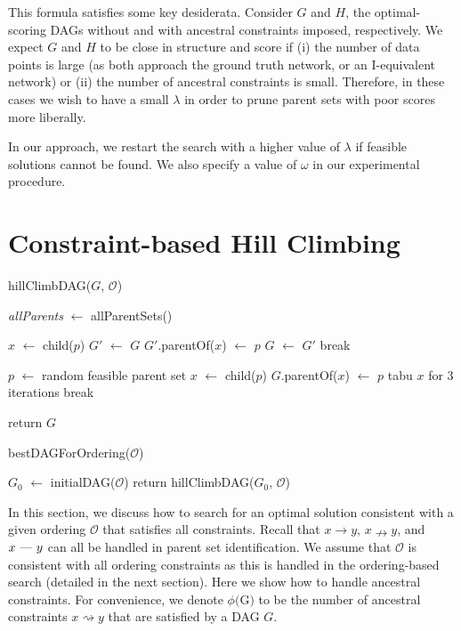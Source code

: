 \documentclass[twoside,11pt]{article}
\begin{document}
\smallskip
This formula satisfies some key desiderata. Consider $G$ and $H$, the optimal-scoring DAGs without and with ancestral constraints imposed, respectively. 
We expect $G$ and $H$ to be close in structure and score if (i) the number of data points is large (as both approach the ground truth network, or an I-equivalent network)
or (ii) the number of ancestral constraints is small. Therefore, in these cases we wish to have a small $\lambda$ in order to prune parent sets with poor scores more liberally.
  
\smallskip
In our approach, we restart the search with a higher value of $\lambda$ if feasible solutions cannot be found. We also specify a value of $\omega$ in our experimental procedure.


\section{Constraint-based Hill Climbing}
\label{SECTION:ConstraintBasedHillClimbing}

\begin{algorithm}[t]
	\caption{hillClimbDAG($G$, $\mathcal{O}$)}
 		\emph{allParents} $\leftarrow$ allParentSets()  
		
		 {
			 {
				$x$ $\leftarrow$ child($p$) \;
				 {
					$G'$ $\leftarrow$ $G$\;
					$G'$.parentOf($x$) $\leftarrow$ $p$ \;
					 {
						$G$ $\leftarrow$ $G'$ \;
						break \;
					}
				}
			}
			
			 {
				 { 
					$p$ $\leftarrow$ random feasible parent set\;
					$x$ $\leftarrow$ child($p$) \;
					$G$.parentOf($x$) $\leftarrow$ $p$ \;
					tabu $x$ for $3$ iterations \;
				}
				 {
					break \;
				}
			}
			
		}
	
	return $G$ \;
\end{algorithm}
\begin{algorithm}[t]
	\caption{bestDAGForOrdering($\mathcal{O}$)}
 		$G_0$ $\leftarrow$ initialDAG($\mathcal{O}$) \;
		return hillClimbDAG($G_0$, $\mathcal{O}$) \;
\end{algorithm}

In this section, we discuss how to search for an optimal solution consistent with a given ordering $\mathcal{O}$ that satisfies all constraints. Recall that  $x \rightarrow y$, $x \nrightarrow y$, and $x \text{ \textemdash \  } y$ can all be handled in parent set identification. We assume that $\mathcal{O}$ is consistent with all ordering constraints as this is handled in the ordering-based search (detailed in the next section). Here we show how to handle ancestral constraints.
For convenience, we denote $\phi($G$)$ to be the number of ancestral constraints $x \rightsquigarrow y$ that are satisfied by a DAG $G$.
\end{document}
